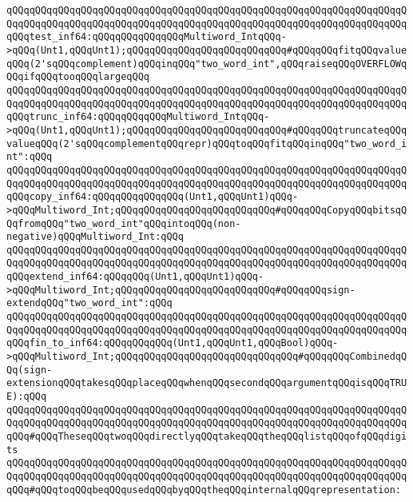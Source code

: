 \verb|qQQqqQQqqQQqqQQqqQQqqQQqqQQqqQQqqQQqqQQqqQQqqQQqqQQqqQQqqQQqqQQqqQQqqQQqqQQqqQQqqQQqqQQqqQQqqQQqqQQqqQQqqQQqqQQqqQQqqQQqqQQqqQQqqQQqqQQqqQQqqQQqtest_inf64:qQQqqQQqqQQqqQQqMultiword_IntqQQq->qQQq(Unt1,qQQqUnt1);qQQqqQQqqQQqqQQqqQQqqQQqqQQq#qQQqqQQqfitqQQqvalueqQQq(2'sqQQqcomplement)qQQqinqQQq"two_word_int",qQQqraiseqQQqOVERFLOWqQQqifqQQqtooqQQqlargeqQQq|\newline
\newline
\verb|qQQqqQQqqQQqqQQqqQQqqQQqqQQqqQQqqQQqqQQqqQQqqQQqqQQqqQQqqQQqqQQqqQQqqQQqqQQqqQQqqQQqqQQqqQQqqQQqqQQqqQQqqQQqqQQqqQQqqQQqqQQqqQQqqQQqqQQqqQQqqQQqtrunc_inf64:qQQqqQQqqQQqMultiword_IntqQQq->qQQq(Unt1,qQQqUnt1);qQQqqQQqqQQqqQQqqQQqqQQqqQQq#qQQqqQQqtruncateqQQqvalueqQQq(2'sqQQqcomplementqQQqrepr)qQQqtoqQQqfitqQQqinqQQq"two_word_int":qQQq|\newline
\verb|qQQqqQQqqQQqqQQqqQQqqQQqqQQqqQQqqQQqqQQqqQQqqQQqqQQqqQQqqQQqqQQqqQQqqQQqqQQqqQQqqQQqqQQqqQQqqQQqqQQqqQQqqQQqqQQqqQQqqQQqqQQqqQQqqQQqqQQqqQQqqQQqcopy_inf64:qQQqqQQqqQQqqQQq(Unt1,qQQqUnt1)qQQq->qQQqMultiword_Int;qQQqqQQqqQQqqQQqqQQqqQQqqQQq#qQQqqQQqCopyqQQqbitsqQQqfromqQQq"two_word_int"qQQqintoqQQq(non-negative)qQQqMultiword_Int:qQQq|\newline
\verb|qQQqqQQqqQQqqQQqqQQqqQQqqQQqqQQqqQQqqQQqqQQqqQQqqQQqqQQqqQQqqQQqqQQqqQQqqQQqqQQqqQQqqQQqqQQqqQQqqQQqqQQqqQQqqQQqqQQqqQQqqQQqqQQqqQQqqQQqqQQqqQQqextend_inf64:qQQqqQQq(Unt1,qQQqUnt1)qQQq->qQQqMultiword_Int;qQQqqQQqqQQqqQQqqQQqqQQqqQQq#qQQqqQQqsign-extendqQQq"two_word_int":qQQq|\newline
\newline
\verb|qQQqqQQqqQQqqQQqqQQqqQQqqQQqqQQqqQQqqQQqqQQqqQQqqQQqqQQqqQQqqQQqqQQqqQQqqQQqqQQqqQQqqQQqqQQqqQQqqQQqqQQqqQQqqQQqqQQqqQQqqQQqqQQqqQQqqQQqqQQqqQQqfin_to_inf64:qQQqqQQqqQQq(Unt1,qQQqUnt1,qQQqBool)qQQq->qQQqMultiword_Int;qQQqqQQqqQQqqQQqqQQqqQQqqQQqqQQq#qQQqqQQqCombinedqQQq(sign-extensionqQQqtakesqQQqplaceqQQqwhenqQQqsecondqQQqargumentqQQqisqQQqTRUE):qQQq|\newline
\newline
\verb|qQQqqQQqqQQqqQQqqQQqqQQqqQQqqQQqqQQqqQQqqQQqqQQqqQQqqQQqqQQqqQQqqQQqqQQqqQQqqQQqqQQqqQQqqQQqqQQqqQQqqQQqqQQqqQQqqQQqqQQqqQQqqQQqqQQqqQQqqQQqqQQq#qQQqTheseqQQqtwoqQQqdirectlyqQQqtakeqQQqtheqQQqlistqQQqofqQQqdigits|\newline
\verb|qQQqqQQqqQQqqQQqqQQqqQQqqQQqqQQqqQQqqQQqqQQqqQQqqQQqqQQqqQQqqQQqqQQqqQQqqQQqqQQqqQQqqQQqqQQqqQQqqQQqqQQqqQQqqQQqqQQqqQQqqQQqqQQqqQQqqQQqqQQqqQQq#qQQqtoqQQqbeqQQqusedqQQqbyqQQqtheqQQqinternalqQQqrepresentation:|\newline
